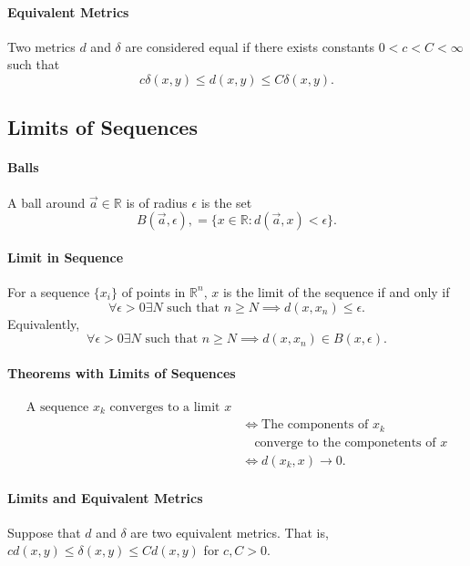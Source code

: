\documentclass[12pt, letterpaper]{article}
\begin{document}
    \paragraph{Equivalent Metrics}
    Two metrics \(d\) and \(\delta\) are considered equal if 
    there exists constants \(0 < c < C < \infty\) such that
    \[ c\delta (x,y) \leq d(x,y) \leq C \delta(x, y).\]
    
    \subsection{Limits of Sequences}

    \paragraph{Balls} A ball around \(\vec{a}\in \mathbb{R} \) is of radius \( \epsilon \) is the set
    \[B(\vec{a}, \epsilon), = \{x\in \mathbb{R} : d(\vec{a}, x) < \epsilon\}.\]
    
    \paragraph{Limit in Sequence} 
    For a sequence \( \{x_i\} \) of points in \( \mathbb{R}^n \),
    \(x\) is the limit of the sequence if and only if 
    \[\forall \epsilon > 0 \exists N \text{ such that } n \geq N \implies d(x, x_n) \leq \epsilon. \]
    Equivalently,
    \[\forall \epsilon > 0 \exists N \text{ such that } n \geq N \implies d(x, x_n) \in B(x, \epsilon).\]

    \paragraph{Theorems with Limits of Sequences}
    \begin{align*}
        \text{A sequence \(x_k\) converges to a limit \(x\)}\\
        &\Leftrightarrow \text{The components of \(x_k\)} \\
        & \quad \text{converge to the componetents of \(x\)} \\
        & \Leftrightarrow d(x_k, x) \rightarrow 0.
    \end{align*}

    \paragraph{Limits and Equivalent Metrics}
    Suppose that \(d\) and \(\delta\) are two equivalent metrics.
    That is, \(cd(x,y) \leq \delta (x, y) \leq Cd(x,y)\) for \(c, C > 0\).
\end{document}
